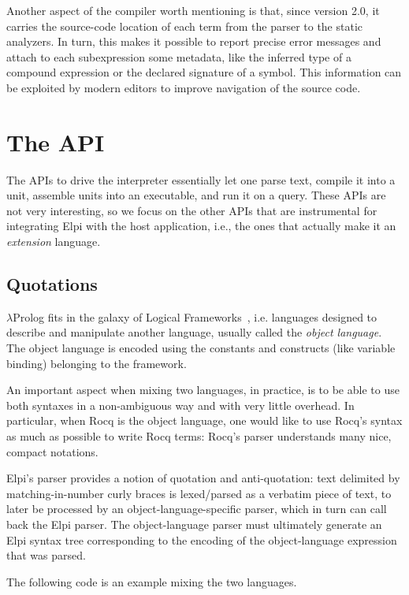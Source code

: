 \documentclass{these-ISSS}
\begin{document}
Another aspect of the compiler worth mentioning is that, since version 2.0, it
carries the source-code location of each term from the parser to the static
analyzers. In turn, this makes it possible to report precise error messages and
attach to each subexpression some metadata, like the inferred type of a
compound expression or the declared signature of a symbol. This information can be
exploited by modern editors to improve navigation of the source code.

\section{The API}\label{sec:API}


The APIs to drive the interpreter essentially let one parse text, compile it
into a unit, assemble units into an executable, and run it on a query. These
APIs are not very interesting, so we focus on the other APIs that are
instrumental for integrating Elpi with the host application, i.e., the ones
that actually make it an \emph{extension} language.

\subsection{Quotations}\label{sec:quotations}

$\lambda$Prolog fits in the galaxy of Logical Frameworks~\cite{HarperHP87},
i.e. languages designed to describe and manipulate another language,
usually called the \emph{object language}. The object language is encoded
using the constants and constructs (like variable binding) belonging to the
framework.


An important aspect when mixing two languages, in practice, is to be able to
use both syntaxes in a non-ambiguous way and with very little overhead. In
particular, when Rocq is the object language, one would like to use Rocq's
syntax as much as possible to write Rocq terms: Rocq's parser understands many
nice, compact notations.


Elpi's parser provides a notion of quotation and anti-quotation: text delimited
by matching-in-number curly braces is lexed/parsed as a verbatim piece of text,
to later be processed by an object-language-specific parser, which in turn can
call back the Elpi parser. The object-language parser must ultimately generate
an Elpi syntax tree corresponding to the encoding of the object-language
expression that was parsed.

The following code is an example mixing the two languages.
\end{document}
